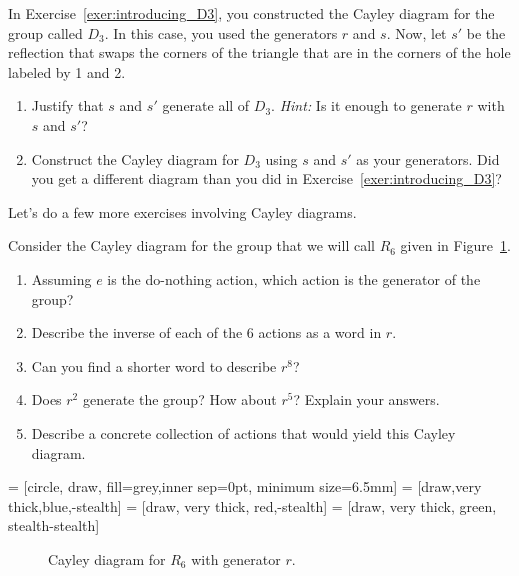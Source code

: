 \begin{exercise}\label{exer:alternate_D3}
In Exercise~\ref{exer:introducing_D3}, you constructed the Cayley diagram for the group called $D_3$.  In this case, you used the generators $r$ and $s$.  Now, let $s'$ be the reflection that swaps the corners of the triangle that are in the corners of the hole labeled by 1 and 2.  
\begin{enumerate}[label=\rm{(\alph*)}]
\item Justify that $s$ and $s'$ generate all of $D_3$.  \emph{Hint:} Is it enough to generate $r$ with $s$ and $s'$?
\item Construct the Cayley diagram for $D_3$ using $s$ and $s'$ as your generators.  Did you get a different diagram than you did in Exercise~\ref{exer:introducing_D3}?
\end{enumerate}
\end{exercise}

Let's do a few more exercises involving Cayley diagrams.

\begin{exercise}\label{exer:intro_R6} 
Consider the Cayley diagram for the group that we will call $R_6$ given in Figure~\ref{fig:rotation6}. 
\begin{enumerate}[label=\rm{(\alph*)}]
\item Assuming $e$ is the do-nothing action, which action is the generator of the group?
\item Describe the inverse of each of the 6 actions as a word in $r$.
\item Can you find a shorter word to describe $r^8$?
\item Does $r^2$ generate the group? How about $r^5$?  Explain your answers.
\item Describe a concrete collection of actions that would yield this Cayley diagram.
\end{enumerate}
\end{exercise}

 = [circle, draw, fill=grey,inner sep=0pt, minimum size=6.5mm]
 = [draw,very thick,blue,-stealth]
 = [draw, very thick, red,-stealth]
 = [draw, very thick, green, stealth-stealth]

\begin{figure}[!ht]
\centering
{}
\caption{Cayley diagram for $R_6$ with generator $r$.}
\label{fig:rotation6}
\end{figure}

